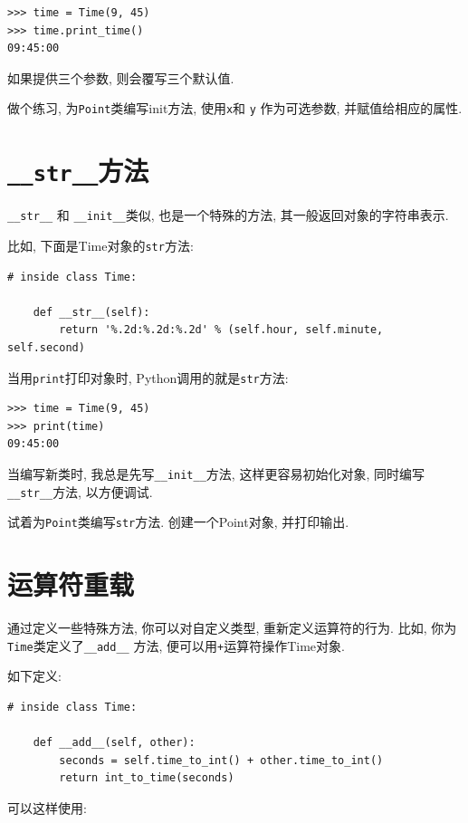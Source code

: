 \documentclass[10pt]{book}
\begin{document}
\begin{verbatim}
>>> time = Time(9, 45)
>>> time.print_time()
09:45:00
\end{verbatim}
%
如果提供三个参数, 则会覆写三个默认值. 

做个练习, 为{\tt Point}类编写init方法, 使用{\tt x}和 {\tt y} 作为可选参数, 
并赋值给相应的属性. 


\section{{\tt \_\_str\_\_}方法}

\verb"__str__" 和 \verb"__init__"类似, 也是一个特殊的方法, 
其一般返回对象的字符串表示. 

比如, 下面是Time对象的{\tt str}方法:

\begin{verbatim}
# inside class Time:

    def __str__(self):
        return '%.2d:%.2d:%.2d' % (self.hour, self.minute, self.second)
\end{verbatim}
%
当用{\tt print}打印对象时, Python调用的就是{\tt str}方法:

\begin{verbatim}
>>> time = Time(9, 45)
>>> print(time)
09:45:00
\end{verbatim}
%
当编写新类时, 我总是先写\verb"__init__"方法, 这样更容易初始化对象, 
同时编写\verb"__str__"方法, 以方便调试. 

试着为{\tt Point}类编写{\tt str}方法. 
创建一个Point对象, 并打印输出. 


\section{运算符重载}
\label{operator.overloading}

通过定义一些特殊方法, 你可以对自定义类型, 重新定义运算符的行为. 
比如, 你为{\tt Time}类定义了\verb"__add__" 方法, 便可以用{\tt +}运算符操作Time对象. 

如下定义:

\begin{verbatim}
# inside class Time:

    def __add__(self, other):
        seconds = self.time_to_int() + other.time_to_int()
        return int_to_time(seconds)
\end{verbatim}
%
可以这样使用:
\end{document}
